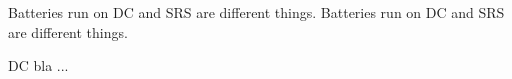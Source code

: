 \documentclass{article}
\begin{document}
Batteries run on \ac{DC} and \ac{SRS} are different things.
Batteries run on \ac{DC} and \ac{SRS} are different things.

\ac{DC} bla ...

\printacronyms
\end{document}
